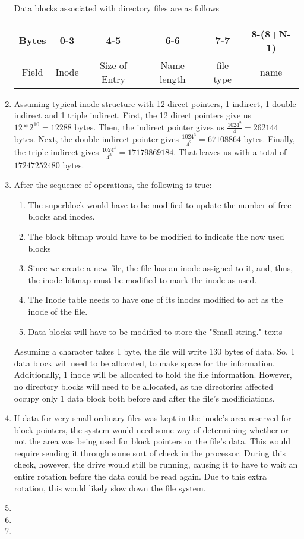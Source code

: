 \documentclass[12pt,letterpaper]{report}
\begin{document}
\begin{enumerate}
Data blocks associated with directory files are as follows\\
\begin{tabular}{|c|c|c|c|c|c|}
\hline
Bytes & 0-3 & 4-5 & 6-6 & 7-7 & 8-(8+N-1) \\
\hline
Field & Inode & Size of Entry & Name length & file type & name\\
\hline
\end{tabular}
\item Assuming typical inode structure with 12 direct pointers, 1 indirect, 1 double indirect and 1 triple indirect. First, the 12 direct pointers give us $12 * 2^{10} = 12288$ bytes. Then, the indirect pointer gives us $\frac{1024^2}{4} = 262144$ bytes. Next, the double indirect pointer gives $\frac{1024^3}{4^2} = 67108864$ bytes. Finally, the triple indirect gives $\frac{1024^4}{4^3} = 17179869184$. That leaves us with a total of $17247252480$ bytes.

\item After the sequence of operations, the following is true:
\begin{enumerate}
\item The superblock would have to be modified to update the number of free blocks and
inodes.
\item The block bitmap would have to be modified to indicate the now used blocks
\item Since we create a new file, the file has an inode assigned to it, and, thus,
the inode bitmap must be modified to mark the inode as used.
\item The Inode table needs to have one of its inodes modified to act as the inode of the
file. 
\item Data blocks will have to be modified to store the "Small string." texts
\end{enumerate}
Assuming a character takes 1 byte, the file will write 130 bytes of data. So, 1 data block
will need to be allocated, to make space for the information. Additionally, 1 inode will be
allocated to hold the file information. However, no directory blocks will need to be
allocated, as the directories affected occupy only 1 data block both before and after the
file's modificiations. 
\item If data for very small ordinary files was kept in the inode's area reserved for block
pointers, the system would need some way of determining whether or not the area was being
used for block pointers or the file's data. This would require sending it through some sort
of check in the processor. During this check, however, the drive would still be running,
causing it to have to wait an entire rotation before the data could be read again.
Due to this extra rotation, this would likely slow down the file system. 

\item 

\item

\item



\end{enumerate}
\end{document}
